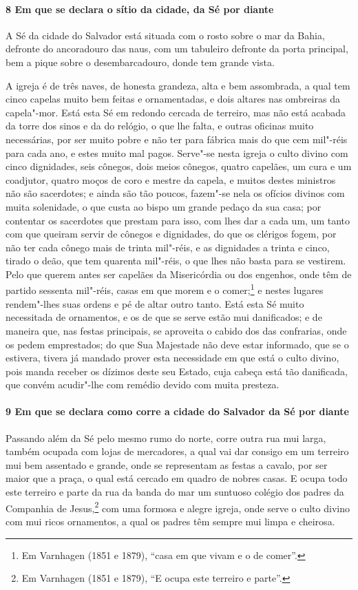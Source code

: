 \begin{linenumbers}
\paragraph{8 Em que se declara o sítio da cidade, da Sé por diante} \quad
A Sé da cidade do Salvador está situada com o rosto sobre o mar da Bahia, defronte do
ancoradouro das naus, com um tabuleiro defronte da porta principal, bem a pique sobre o
desembarcadouro, donde tem grande vista.

A igreja é de três naves, de honesta grandeza, alta e bem assombrada, a qual tem cinco
capelas muito bem feitas e ornamentadas, e dois altares nas ombreiras da capela"-mor. Está
esta Sé em redondo cercada de terreiro, mas não está acabada da torre dos sinos e da do
relógio, o que lhe falta, e outras oficinas muito necessárias, por ser muito pobre e não
ter para fábrica mais do que cem mil"-réis para cada ano, e estes muito mal pagos. Serve"-se
nesta igreja o culto divino com cinco dignidades, seis cônegos, dois meios cônegos, quatro
capelães, um cura e um coadjutor, quatro moços de coro e mestre da capela, e muitos destes
ministros não são sacerdotes; e ainda são tão poucos, fazem"-se nela os ofícios divinos com
muita solenidade, o que custa ao bispo um grande pedaço da sua casa; por contentar os
sacerdotes que prestam para isso, com lhes dar a cada um, um tanto com que queiram servir
de cônegos e dignidades, do que os clérigos fogem, por não ter cada cônego mais de trinta
mil"-réis, e as dignidades a trinta e cinco, tirado o deão, que tem quarenta mil"-réis, o
que lhes não basta para se vestirem. Pelo que querem antes ser capelães da Misericórdia ou
dos engenhos, onde têm de partido sessenta mil"-réis, casas em que morem e o
comer;\footnote{ Em Varnhagen (1851 e 1879), ``casa em que vivam e o de comer''.} e nestes
lugares rendem"-lhes suas ordens e pé de altar outro tanto. Está esta Sé muito necessitada
de ornamentos, e os de que se serve estão mui danificados; e de maneira que, nas festas
principais, se aproveita o cabido dos das confrarias, onde os pedem emprestados; do que
Sua Majestade não deve estar informado, que se o estivera, tivera já mandado prover esta
necessidade em que está o culto divino, pois manda receber os dízimos deste seu Estado,
cuja cabeça está tão danificada, que convém acudir"-lhe com remédio devido com muita
presteza.

\paragraph{9 Em que se declara como corre a cidade do Salvador da Sé por diante} \quad
Passando além da Sé pelo mesmo rumo do norte, corre outra rua mui larga, também ocupada
com lojas de mercadores, a qual vai dar consigo em um terreiro mui bem assentado e grande,
onde se representam as festas a cavalo, por ser maior que a praça, o qual está cercado em
quadro de nobres casas. E ocupa todo este terreiro e parte da rua da banda do mar um
suntuoso colégio dos padres da Companhia de Jesus,\footnote{ Em Varnhagen (1851 e 1879),
``E ocupa este terreiro e parte''.} com uma formosa e alegre igreja, onde serve o culto
divino com mui ricos ornamentos, a qual os padres têm sempre mui limpa e cheirosa.


\end{linenumbers}
